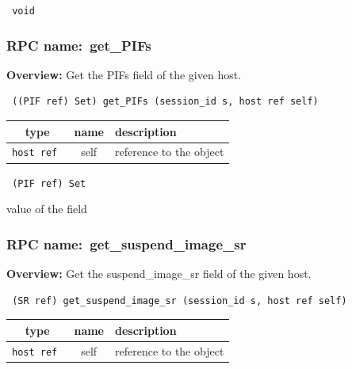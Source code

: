 {\tt 
void
}



\vspace{0.3cm}
\vspace{0.3cm}
\vspace{0.3cm}
\subsubsection{RPC name:~get\_PIFs}

{\bf Overview:} 
Get the PIFs field of the given host.

\begin{verbatim} ((PIF ref) Set) get_PIFs (session_id s, host ref self)\end{verbatim}



 
\vspace{0.3cm}
\begin{tabular}{|c|c|p{7cm}|}
 \hline
{\bf type} & {\bf name} & {\bf description} \\ \hline
{\tt host ref } & self & reference to the object \\ \hline 

\end{tabular}

\vspace{0.3cm}

{\tt 
(PIF ref) Set
}


value of the field
\vspace{0.3cm}
\vspace{0.3cm}
\vspace{0.3cm}
\subsubsection{RPC name:~get\_suspend\_image\_sr}

{\bf Overview:} 
Get the suspend\_image\_sr field of the given host.

\begin{verbatim} (SR ref) get_suspend_image_sr (session_id s, host ref self)\end{verbatim}



 
\vspace{0.3cm}
\begin{tabular}{|c|c|p{7cm}|}
 \hline
{\bf type} & {\bf name} & {\bf description} \\ \hline
{\tt host ref } & self & reference to the object \\ \hline 

\end{tabular}

